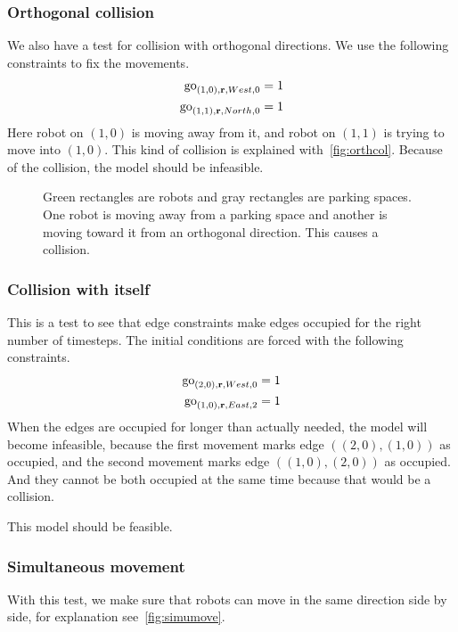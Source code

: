 \subsubsection{Orthogonal collision}
We also have a test for collision with orthogonal directions.
We use the following constraints to fix the movements.
\begin{align}
    \mathrm{go}_{(1,0),\text{\bf r},West,0} &= 1\\
    \mathrm{go}_{(1,1),\text{\bf r},North,0} &= 1
\end{align}
Here robot on $(1,0)$ is moving away from it, and robot on $(1,1)$ is trying to
move into $(1,0)$. This kind of collision is explained
with~\autoref{fig:orthcol}. Because of the collision, the model should be
infeasible.

\begin{figure}[h]
    \begin{center}
        
        \caption{Green rectangles are robots and gray rectangles are parking
            spaces. One robot is moving away from a parking space and another is
        moving toward it from an orthogonal direction. This causes a collision.}
        \label{fig:orthcol}
    \end{center}
\end{figure}

\subsubsection{Collision with itself}
This is a test to see that edge constraints make edges occupied for the right
number of timesteps. The initial conditions are forced with the following
constraints.
\begin{align}
    \mathrm{go}_{(2,0),\text{\bf r},West,0} &= 1\\
    \mathrm{go}_{(1,0),\text{\bf r},East,2} &= 1
\end{align}
When the edges are occupied for longer than actually needed, the model will
become infeasible, because the first movement marks edge $((2,0),(1,0))$ as
occupied, and the second movement marks edge $((1,0),(2,0))$ as occupied. And
they cannot be both occupied at the same time because that would be a
collision.

This model should be feasible.
\subsubsection{Simultaneous movement}
With this test, we make sure that robots can move in the same direction side by
side, for explanation see~\autoref{fig:simumove}.

